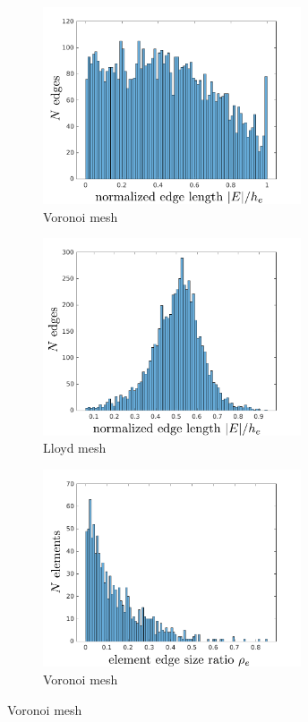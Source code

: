 \begin{figure}[!h]
    \centering
    \begin{subfigure}[b]{0.49\linewidth}
            \centering
            \includegraphics[width=3.0in]{figures/patch_edge_lengths.pdf}
    			\caption{Voronoi mesh \label{fig:patch_edge_lengths}}
    \end{subfigure}
	\begin{subfigure}[b]{0.49\linewidth}
            \centering
            \includegraphics[width=3.0in]{figures/lloyd_edge_lengths.pdf}
    			\caption{Lloyd mesh \label{fig:lloyd_edge_lengths}}
    \end{subfigure}
    \begin{subfigure}[b]{0.49\linewidth}
            \centering
            \includegraphics[width=3.0in]{figures/patch_edge_ratios.pdf}
    			\caption{Voronoi mesh \label{fig:patch_edge_ratios}}

\end{subfigure}
\end{figure}
